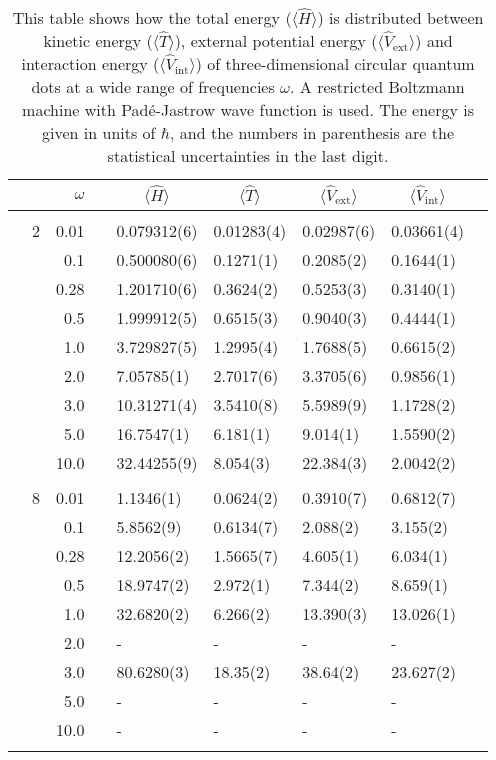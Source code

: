 \begin{table}[H]
	\caption{This table shows how the total energy ($\langle\hat{H}\rangle$) is distributed between kinetic energy ($\langle\hat{T}\rangle$), external potential energy ($\langle\hat{V}_{\text{ext}}\rangle$) and interaction energy ($\langle\hat{V}_{\text{int}}\rangle$) of three-dimensional circular quantum dots at a wide range of frequencies $\omega$. A restricted Boltzmann machine with Padé-Jastrow wave function is used. The energy is given in units of $\hbar$, and the numbers in parenthesis are the statistical uncertainties in the last digit.}
	\label{tab:splitfrequencyQDRBMPJ3D}
	\begin{tabularx}{\textwidth}{R{1cm}rrcR{2.3cm}R{2.3cm}R{2.3cm}R{2.3cm}R{1cm}} \hline\hline
		&\makecell{\\ \phantom{$N$} \\ \phantom{=}} & $\omega$ &&  &  &  &  & \\ \hline \\
		&2 & 0.01 && 0.079312(6) & 0.01283(4) & 0.02987(6) & 0.03661(4) \\
		&& 0.1 && 0.500080(6) & 0.1271(1) & 0.2085(2) & 0.1644(1) \\
		&& 0.28 && 1.201710(6) & 0.3624(2) & 0.5253(3) & 0.3140(1) \\
		&& 0.5 && 1.999912(5) & 0.6515(3) & 0.9040(3) & 0.4444(1) \\
		&& 1.0 && 3.729827(5) & 1.2995(4) & 1.7688(5) & 0.6615(2) \\
		&& 2.0 && 7.05785(1) & 2.7017(6) & 3.3705(6) & 0.9856(1) \\
		&& 3.0 && 10.31271(4) & 3.5410(8) & 5.5989(9) & 1.1728(2) \\ 
		&& 5.0 && 16.7547(1) & 6.181(1) & 9.014(1) & 1.5590(2) \\
		&& 10.0 && 32.44255(9) & 8.054(3) & 22.384(3) & 2.0042(2) \\
		\hdashline \\
		
		&8 & 0.01 && 1.1346(1) & 0.0624(2) & 0.3910(7) & 0.6812(7) \\
		&& 0.1 && 5.8562(9) & 0.6134(7) & 2.088(2) & 3.155(2) \\
		&& 0.28 && 12.2056(2) & 1.5665(7) & 4.605(1) & 6.034(1) \\
		&& 0.5 && 18.9747(2) & 2.972(1) & 7.344(2) & 8.659(1) \\
		&& 1.0 && 32.6820(2) & 6.266(2) & 13.390(3) & 13.026(1) \\
		&& 2.0 && - & - & - & -\\
		&& 3.0 && 80.6280(3) & 18.35(2) & 38.64(2) & 23.627(2) \\ 
		&& 5.0 && - & - & - & -\\
		&& 10.0 && - & - & - & -\\
		\hdashline \\
		

\end{tabularx}
\end{table}

